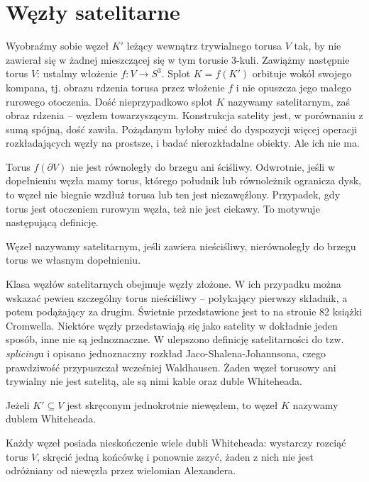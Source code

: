 \section{Węzły satelitarne} %
\label{sec:satellite}
Wyobraźmy sobie węzeł $K'$ leżący wewnątrz trywialnego torusa $V$ tak, by nie zawierał się w żadnej mieszczącej się w tym torusie 3-kuli.
Zawiążmy następnie torus $V$: ustalmy włożenie $f \colon V \to S^3$.
Splot $K = f(K')$ orbituje wokół swojego kompana, tj. obrazu rdzenia torusa przez włożenie $f$ i nie opuszcza jego małego rurowego otoczenia.
Dość nieprzypadkowo splot $K$ nazywamy satelitarnym, zaś obraz rdzenia -- węzłem towarzyszącym.
Konstrukcja satelity jest, w porównaniu z sumą spójną, dość zawiła.
Pożądanym byłoby mieć do dyspozycji więcej operacji rozkładających węzły na prostsze, i badać nierozkładalne obiekty.
Ale ich nie ma.

Torus $f(\partial V)$ nie jest równoległy do brzegu ani ściśliwy.
Odwrotnie, jeśli w dopełnieniu węzła mamy torus, którego południk lub równoleżnik ogranicza dysk, to węzeł nie biegnie wzdłuż torusa lub ten jest niezawęźlony.
Przypadek, gdy torus jest otoczeniem rurowym węzła, też nie jest ciekawy.
To motywuje następującą definicję.

\begin{definition}
	Węzeł nazywamy satelitarnym, jeśli zawiera nieściśliwy, nierównoległy do brzegu torus we własnym dopełnieniu. 
\end{definition}

Klasa węzłów satelitarnych obejmuje węzły złożone.
W ich przypadku można wskazać pewien szczególny torus nieściśliwy -- połykający pierwszy składnik, a potem podążający za drugim.
Świetnie przedstawione jest to na stronie 82 książki \cite{cromwell04} Cromwella.
Niektóre węzły przedstawiają się jako satelity w dokładnie jeden sposób, inne nie są jednoznaczne.
W \cite{jaco79} ulepszono definicję satelitarności do tzw. \emph{splicing}u i opisano jednoznaczny rozkład Jaco-Shalena-Johannsona, czego prawdziwość przypuszczał wcześniej Waldhausen.
Żaden węzeł torusowy ani trywialny nie jest satelitą, ale są nimi kable oraz duble Whiteheada.

\begin{definition}
	Jeżeli $K' \subseteq V$ jest skręconym jednokrotnie niewęzłem, to węzeł $K$ nazywamy dublem Whiteheada.
\end{definition}

Każdy węzeł posiada nieskończenie wiele dubli Whiteheada: wystarczy rozciąć torus $V$, skręcić jedną końcówkę i ponownie zszyć, żaden z nich nie jest odróżniany od niewęzła przez wielomian Alexandera.

